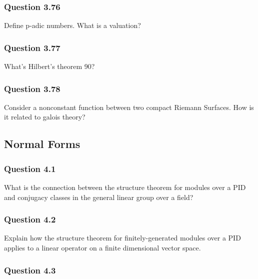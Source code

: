 \hypertarget{question-3.76}{%
\subsubsection{Question 3.76}\label{question-3.76}}

Define p-adic numbers. What is a valuation?

\hypertarget{question-3.77}{%
\subsubsection{Question 3.77}\label{question-3.77}}

What's Hilbert's theorem 90?

\hypertarget{question-3.78}{%
\subsubsection{Question 3.78}\label{question-3.78}}

Consider a nonconstant function between two compact Riemann Surfaces.
How is it related to galois theory?

\hypertarget{normal-forms}{%
\subsection{Normal Forms}\label{normal-forms}}

\hypertarget{question-4.1}{%
\subsubsection{Question 4.1}\label{question-4.1}}

What is the connection between the structure theorem for modules over a
PID and conjugacy classes in the general linear group over a field?

\hypertarget{question-4.2}{%
\subsubsection{Question 4.2}\label{question-4.2}}

Explain how the structure theorem for finitely-generated modules over a
PID applies to a linear operator on a finite dimensional vector space.

\hypertarget{question-4.3}{%
\subsubsection{Question 4.3}\label{question-4.3}}

